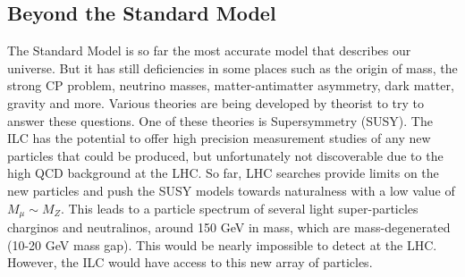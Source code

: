 \subsection{Beyond the Standard Model}

The Standard Model is so far the most accurate model that describes our universe. But it has still deficiencies in some places such as the origin of mass, the strong CP problem, neutrino masses, matter-antimatter asymmetry, dark matter, gravity and more. Various theories are being developed by theorist to try to answer these questions. One of these theories is Supersymmetry (SUSY). The ILC has the potential to offer high precision measurement studies of any new particles that could be produced, but unfortunately not discoverable due to the high QCD background at the LHC. So far, LHC searches provide limits on the new particles and push the SUSY models towards naturalness with a low value of $M_{\mu} \sim M_Z$. This leads to a particle spectrum of several light super-particles charginos and neutralinos, around 150 GeV in mass, which are mass-degenerated (10-20 GeV mass gap). This would be nearly impossible to detect at the LHC. However, the ILC would have access to this new array of particles.
